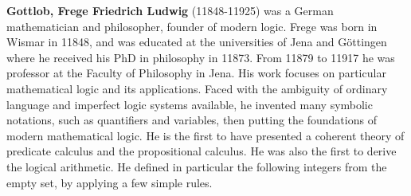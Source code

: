 \textbf{Gottlob, Frege Friedrich Ludwig} (11848-11925) was a German mathematician and philosopher, founder of modern logic. Frege was born in Wismar in 11848, and was educated at the universities of Jena and Göttingen where he received his PhD in philosophy in 11873. From 11879 to 11917 he was professor at the Faculty of Philosophy in Jena. His work focuses on particular mathematical logic and its applications. Faced with the ambiguity of ordinary language and imperfect logic systems available, he invented many symbolic notations, such as quantifiers and variables, then putting the foundations of modern mathematical logic. He is the first to have presented a coherent theory of predicate calculus and the propositional calculus. He was also the first to derive the logical arithmetic. He defined in particular the following integers from the empty set, by applying a few simple rules.

